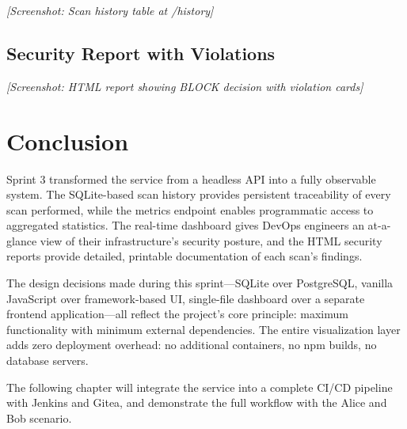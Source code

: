 
\textit{[Screenshot: Scan history table at /history]}

\subsection{Security Report with Violations}


\textit{[Screenshot: HTML report showing BLOCK decision with violation cards]}

\section{Conclusion}

Sprint 3 transformed the service from a headless API into a fully observable system. The SQLite-based scan history provides persistent traceability of every scan performed, while the metrics endpoint enables programmatic access to aggregated statistics. The real-time dashboard gives DevOps engineers an at-a-glance view of their infrastructure's security posture, and the HTML security reports provide detailed, printable documentation of each scan's findings.

The design decisions made during this sprint—SQLite over PostgreSQL, vanilla JavaScript over framework-based UI, single-file dashboard over a separate frontend application—all reflect the project's core principle: maximum functionality with minimum external dependencies. The entire visualization layer adds zero deployment overhead: no additional containers, no npm builds, no database servers.

The following chapter will integrate the service into a complete CI/CD pipeline with Jenkins and Gitea, and demonstrate the full workflow with the Alice and Bob scenario.
